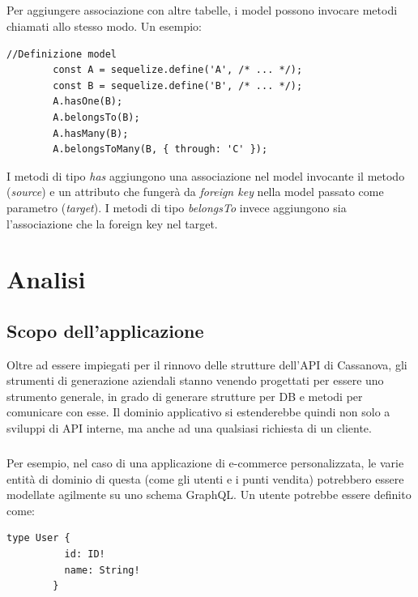 \documentclass[a4paper, 12pt]{report}
\begin{document}
      \paragraph*{}
      Per aggiungere associazione con altre tabelle, i model possono invocare metodi chiamati allo stesso modo. Un esempio:
      \begin{Verbatim}[samepage=true]
        //Definizione model
        const A = sequelize.define('A', /* ... */);
        const B = sequelize.define('B', /* ... */);
        A.hasOne(B);
        A.belongsTo(B);
        A.hasMany(B);
        A.belongsToMany(B, { through: 'C' });
      \end{Verbatim}
       I metodi di tipo \emph{has} aggiungono una associazione nel model invocante il metodo (\emph{source}) e un attributo che fungerà da \emph{foreign key} nella model passato come parametro (\emph{target}).
       I metodi di tipo \emph{belongsTo} invece aggiungono sia l'associazione che la foreign key nel target.
  \newpage
  \chapter{Analisi}
    \section{Scopo dell'applicazione}
      Oltre ad essere impiegati per il rinnovo delle strutture dell'API di Cassanova, gli strumenti di generazione aziendali stanno venendo progettati per essere uno strumento generale, in grado di generare strutture per DB e metodi per comunicare con esse.
      Il dominio applicativo si estenderebbe quindi non solo a sviluppi di API interne, ma anche ad una qualsiasi richiesta di un cliente.
      \paragraph*{}
      Per esempio, nel caso di una applicazione di e-commerce personalizzata, le varie entità di dominio di questa (come gli utenti e i punti vendita) potrebbero essere modellate agilmente su uno schema GraphQL.
      Un utente potrebbe essere definito come:
      \begin{Verbatim}[samepage=true]
        type User {
          id: ID!
          name: String!
        }
      \end{Verbatim}
\end{document}
